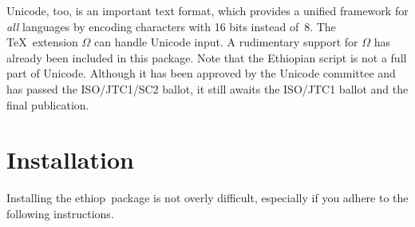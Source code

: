 \documentclass[a4paper]{article}
\newcommand*\ethioplogo{\textsf{ethiop}}
\begin{document}
Unicode, too, is an important text format, which
provides a unified framework for \textit{all}
languages by encoding characters with 16 bits instead of~8.
The \TeX\ extension $\Omega$ can handle Unicode
input. A rudimentary support for $\Omega$ has already 
been included in this package. Note that the Ethiopian
script is not a full part of Unicode. Although it has
been approved by the Unicode committee and has passed the
ISO/JTC1/SC2 ballot, it still awaits the ISO/JTC1 ballot and
the final publication.


\section{Installation}

Installing the \ethioplogo\ package is not overly difficult,
especially if you adhere to the following instructions.
\end{document}

